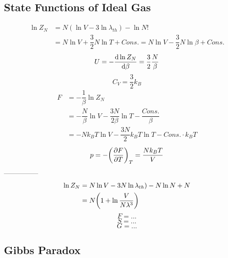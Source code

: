 \documentclass[UTF8]{ctexart} %
\numberwithin{equation}{subsection}
\begin{document}
\subsection{State Functions of Ideal Gas}
\begin{equation}\label{key}
\begin{aligned}
\ln Z_N &= N(\ln V - 3\ln\lambda_{th}) - \ln N!\\
&= N\ln V + \dfrac{3}{2}N\ln T + Cons. = N\ln V - \dfrac{3}{2}N\ln\beta + Cons.
\end{aligned}
\end{equation}
\begin{equation}\label{key}
U = -\dv{\ln Z_N}{\beta} = \dfrac{3}{2}\dfrac{N}{\beta}
\end{equation}
\begin{equation}\label{key}
C_V = \dfrac{3}{2}k_B
\end{equation}
\begin{equation}\label{key}
\begin{aligned}
F &= -\dfrac{1}{\beta}\ln Z_N\\
&= -\dfrac{N}{\beta}\ln V - \dfrac{3N}{2\beta}\ln T - \dfrac{Cons.}{\beta}\\
&= -Nk_B T\ln V - \dfrac{3N}{2}k_B T\ln T - Cons.\cdot k_B T
\end{aligned}
\end{equation}
\begin{equation}\label{key}
p = -\qty(\pdv{F}{T})_T = \dfrac{Nk_B T}{V}
\end{equation}
---------------
\begin{equation}\label{key}
\begin{aligned}
\ln Z_N &= N\ln V - 3N\ln\lambda_{th}) - N\ln N + N\\
&=N\qty(1 + \ln\dfrac{V}{N\lambda^3})
\end{aligned}
\end{equation}
\begin{equation}\label{key}
F = ...
\end{equation}
\begin{equation}\label{key}
S = ...
\end{equation}
\begin{equation}\label{key}
G = ...
\end{equation}

\subsection{Gibbs Paradox}
\end{document}
